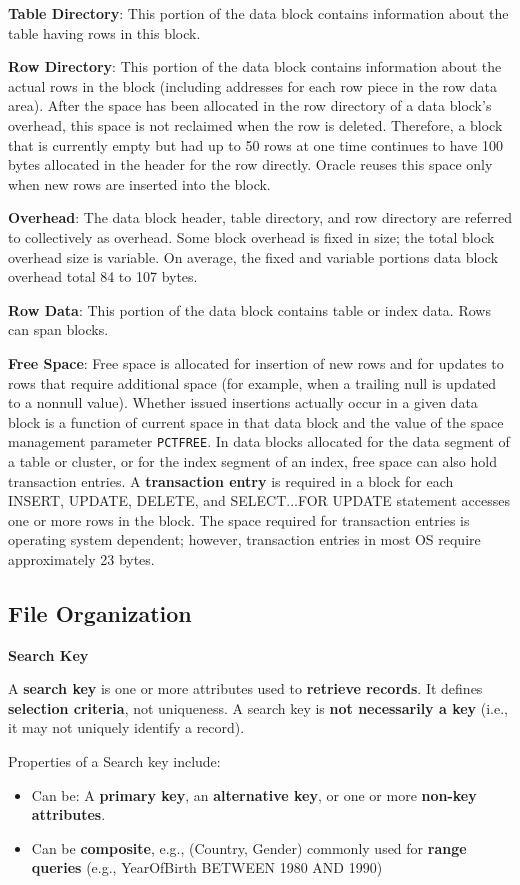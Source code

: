 \documentclass[11pt]{article}
\newcommand{\subsec}[1]{
    \vspace{11pt}
    \subsection{#1}
    \vspace{11pt}
}
\newcommand{\boldsecbottom}[1]{
    \textbf{#1}
    \vspace{11pt}
}
\begin{document}
\textbf{Table Directory}: This portion of the data block contains information about the table having rows in this block.

\textbf{Row Directory}: This portion of the data block contains information about the actual rows in the block (including addresses for each row piece in the row data area). After the space has been allocated in the row directory of a data block's overhead, this space is not reclaimed when the row is deleted. Therefore, a block that is currently empty but had up to 50 rows at one time continues to have 100 bytes allocated in the header for the row directly. Oracle reuses this space only when new rows are inserted into the block.

\textbf{Overhead}: The data block header, table directory, and row directory are referred to collectively as overhead. Some block overhead is fixed in size; the total block overhead size is variable. On average, the fixed and variable portions data block overhead total 84 to 107 bytes.

\textbf{Row Data}: This portion of the data block contains table or index data. Rows can span blocks.

\textbf{Free Space}: Free space is allocated for insertion of new rows and for updates to rows that require additional space (for example, when a trailing null is updated to a nonnull value). Whether issued insertions actually occur in a given data block is a function of current space in that data block and the value of the space management parameter \texttt{PCTFREE}. In data blocks allocated for the data segment of a table or cluster, or for the index segment of an index, free space can also hold transaction entries. A \textbf{transaction entry} is required in a block for each INSERT, UPDATE, DELETE, and SELECT...FOR UPDATE statement accesses one or more rows in the block. The space required for transaction entries is operating system dependent; however, transaction entries in most OS require approximately 23 bytes.

\subsec{File Organization}

\boldsecbottom{Search Key}

A \textbf{search key} is one or more attributes used to \textbf{retrieve records}. It defines \textbf{selection criteria}, not uniqueness. A search key is \textbf{not necessarily a key} (i.e., it may not uniquely identify a record).

Properties of a Search key include:
\begin{itemize}
    \item Can be: A \textbf{primary key}, an \textbf{alternative key}, or one or more \textbf{non-key attributes}.
    \item Can be \textbf{composite}, e.g., (Country, Gender)
    commonly used for \textbf{range queries} (e.g., YearOfBirth BETWEEN 1980 AND 1990)
\end{itemize}
\end{document}
